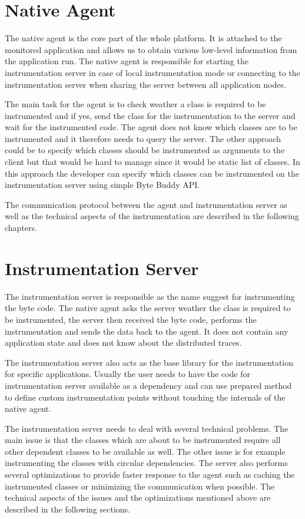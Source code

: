 \section{Native Agent}
The native agent is the core part of the whole platform. It is attached to the monitored application and allows us to obtain various low-level information from the application run. The native agent is responsible for starting the instrumentation server in case of local instrumentation mode or connecting to the instrumentation server when sharing the server between all application nodes.

The main task for the agent is to check weather a class is required to be instrumented and if yes, send the class for the instrumentation to the server and wait for the instrumented code. The agent does not know which classes are to be instrumented and it therefore needs to query the server. The other approach could be to specify which classes should be instrumented as arguments to the client but that would be hard to manage since it would be static list of classes. In this approach the developer can specify which classes can be instrumented on the instrumentation server using simple Byte Buddy API.

The communication protocol between the agent and instrumentation server as well as the technical aspects of the instrumentation are described in the following chapters.
\section{Instrumentation Server}
The instrumentation server is responsible as the name suggest for instrumenting the byte code. The native agent asks the server weather the class is required to be instrumented, the server then received the byte code, performs the instrumentation and sends the data back to the agent. It does not contain any application state and does not know about the distributed traces.

The instrumentation server also acts as the base library for the instrumentation for specific applications. Usually the user needs to have the code for instrumentation server available as a dependency and can use prepared method to define custom instrumentation points without touching the internals of the native agent.

The instrumentation server needs to deal with several technical problems. The main issue is that the classes which are about to be instrumented require all other dependent classes to be available as well. The other issue is for example instrumenting the classes with circular dependencies. The server also performs several optimizations to provide faster response to the agent such as caching the instrumented classes or minimizing the communication when possible. The technical aspects of the issues and the optimizations mentioned above are described in the following sections.
